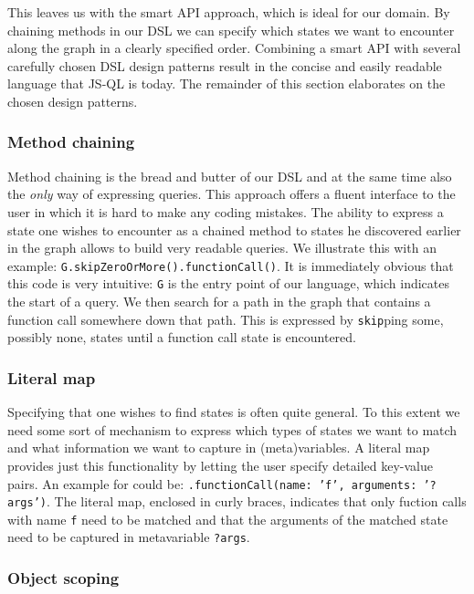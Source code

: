 This leaves us with the smart API approach, which is ideal for our domain. By chaining methods in our DSL we can specify which states we want to encounter along the graph in a clearly specified order. Combining a smart API with several carefully chosen DSL design patterns result in the concise and easily readable language that JS-QL is today. The remainder of this section elaborates on the chosen design patterns.

\subsubsection*{Method chaining}

Method chaining is the bread and butter of our DSL and at the same time also the \textit{only} way of expressing queries. This approach offers a fluent interface to the user in which it is hard to make any coding mistakes. The ability to express a state one wishes to encounter as a chained method to states he discovered earlier in the graph allows to build very readable queries. We illustrate this with an example: \texttt{G.skipZeroOrMore().functionCall()}. It is immediately obvious that this code is very intuitive: \texttt{G} is the entry point of our language, which indicates the start of a query. We then search for a path in the graph that contains a function call somewhere down that path. This is expressed by \texttt{skip}ping some, possibly none, states until a function call state is encountered.

\subsubsection*{Literal map}
Specifying that one wishes to find states is often quite general. To this extent we need some sort of mechanism to express which types of states we want to match and what information we want to capture in (meta)variables. A literal map provides just this functionality by letting the user specify detailed key-value pairs. An example for could be: \texttt{.functionCall({name: 'f', arguments: '?args'})}. The literal map, enclosed in curly braces, indicates that only fuction calls with name \texttt{f} need to be matched and that the arguments of the matched state need to be captured in metavariable \texttt{?args}.

\subsubsection*{Object scoping}

